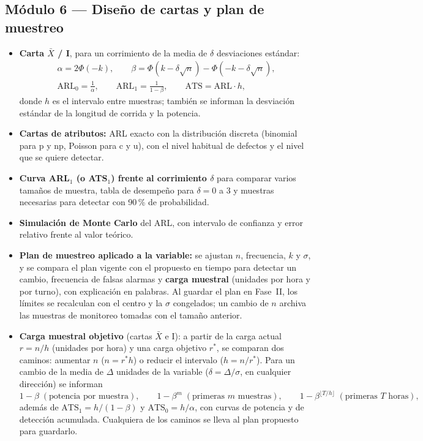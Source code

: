 \documentclass[11pt,a4paper]{article}
\begin{document}
\subsection{Módulo 6 — Diseño de cartas y plan de muestreo}
\begin{itemize}
\item \textbf{Carta $\bar{X}$ / I}, para un corrimiento de la media de $\delta$ desviaciones
  estándar:
  \begin{gather*}
  \alpha = 2\Phi(-k),\qquad
  \beta = \Phi(k-\delta\sqrt{n})-\Phi(-k-\delta\sqrt{n}),\\
  \text{ARL}_0=\frac{1}{\alpha},\qquad
  \text{ARL}_1=\frac{1}{1-\beta},\qquad
  \text{ATS}=\text{ARL}\cdot h,
  \end{gather*}
  donde $h$ es el intervalo entre muestras; también se informan la desviación estándar de la
  longitud de corrida y la potencia.
\item \textbf{Cartas de atributos:} ARL exacto con la distribución discreta (binomial para p y
  np, Poisson para c y u), con el nivel habitual de defectos y el nivel que se quiere detectar.
\item \textbf{Curva ARL$_1$ (o ATS$_1$) frente al corrimiento $\delta$} para comparar varios
  tamaños de muestra, tabla de desempeño para $\delta=0$ a $3$ y muestras necesarias para
  detectar con 90\,\% de probabilidad.
\item \textbf{Simulación de Monte Carlo} del ARL, con intervalo de confianza y error relativo
  frente al valor teórico.
\item \textbf{Plan de muestreo aplicado a la variable:} se ajustan $n$, frecuencia, $k$ y
  $\sigma$, y se compara el plan vigente con el propuesto en tiempo para detectar un cambio,
  frecuencia de falsas alarmas y \textbf{carga muestral} (unidades por hora y por turno), con
  explicación en palabras. Al guardar el plan en Fase~II, los límites se recalculan con el centro
  y la $\sigma$ congelados; un cambio de $n$ archiva las muestras de monitoreo tomadas con el
  tamaño anterior.
\item \textbf{Carga muestral objetivo} (cartas $\bar{X}$ e I): a partir de la carga actual
  $r = n/h$ (unidades por hora) y una carga objetivo $r^*$, se comparan dos caminos: aumentar $n$
  ($n = r^* h$) o reducir el intervalo ($h = n/r^*$). Para un cambio de la media de $\Delta$
  unidades de la variable ($\delta = \Delta/\sigma$, en cualquier dirección) se informan
  \[
  1-\beta \;(\text{potencia por muestra}),\qquad 1-\beta^{m}\;(\text{primeras } m \text{ muestras}),\qquad
  1-\beta^{\lfloor T/h \rfloor}\;(\text{primeras } T \text{ horas}),
  \]
  además de $\text{ATS}_1 = h/(1-\beta)$ y $\text{ATS}_0 = h/\alpha$, con curvas de potencia y de
  detección acumulada. Cualquiera de los caminos se lleva al plan propuesto para guardarlo.
\end{itemize}
\end{document}
